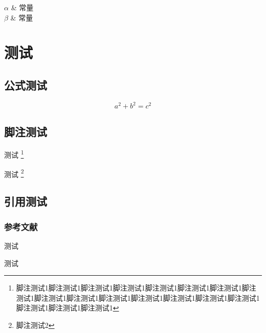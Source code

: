 \documentclass[type = doctor]{whu-thesis}
\begin{document}
\begin{abstract}
  \zhlipsum[1]
\end{abstract}

\begin{abstract*}
  \lipsum[1]
\end{abstract*}

\tableofcontents


\begin{notation}
  $\alpha$ & 常量 \\
  $\beta$ & 常量 \\
\end{notation}



\mainmatter

\chapter{测试}

\section{公式测试}

\begin{equation}
  a^2 + b^2 = c^2
\end{equation}



\section{脚注测试}

测试 \footnote{脚注测试1脚注测试1脚注测试1脚注测试1脚注测试1脚注测试1脚注测试1脚注测试1脚注测试1脚注测试1脚注测试1脚注测试1脚注测试1脚注测试1脚注测试1脚注测试1脚注测试1脚注测试1}

测试 \footnote{脚注测试2}



\section{引用测试}

\subsection{参考文献}

测试\cite{whu-bachelor:1,whu-bachelor:2,whu-bachelor:3,whu-bachelor:5,whu-bachelor:7}

测试\cite*{whu-bachelor:1,whu-bachelor:2,whu-bachelor:3,whu-bachelor:7}
\end{document}
